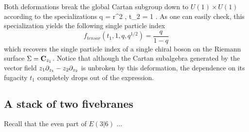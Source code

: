 Both deformations break the global Cartan subgroup down to $U(1) \times U(1)$ according to the specializations
\beqn\label{eqn:special1}
q = r^2 , \quad t_2 = 1 .
\eeqn
As one can easily check, this specialization yields the following single particle index
\[
f_{tensor}(t_1, 1, q, q^{1/2}) = \frac{q}{1-q} 
\]
which recovers the single particle index of a single chiral boson on the Riemann surface $\Sigma = \mathbf{C}_{z_1}$. 
Notice that although the Cartan subalgebra generated by the vector field $z_1 \partial_{z_1} - z_2 \partial_{z_2}$ is unbroken by this deformation, the dependence on its fugacity $t_1$ completely drops out of the expression.

%
%

\subsection{A stack of two fivebranes}

\parsec[]

Recall that the even part of $E(3|6)$ ... 

